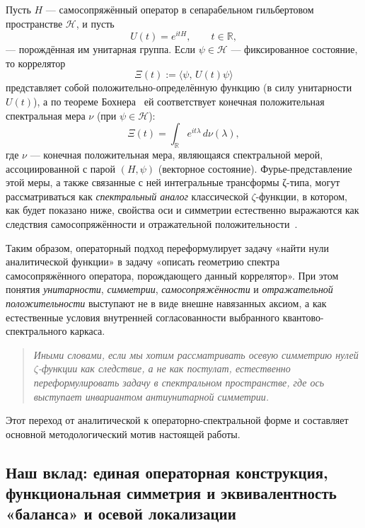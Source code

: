 \documentclass{article}
\numberwithin{equation}{section}
\theoremstyle{plain}
\theoremstyle{definition}
\theoremstyle{remark}
\begin{document}
\medskip
\noindent
Пусть $H$ — самосопряжённый оператор в сепарабельном гильбертовом пространстве $\mathcal H$, и пусть
\begin{equation}
U(t)=e^{itH},\qquad t\in\mathbb R,
\end{equation}
— порождённая им унитарная группа.  
Если $\psi\in\mathcal H$ — фиксированное состояние, то коррелятор
\begin{equation}
\Xi(t):=\langle\psi,\,U(t)\psi\rangle
\end{equation}
представляет собой положительно-определённую функцию (в силу унитарности $U(t)$), 
а по теореме Бохнера~\cite{Bochner1933} ей соответствует конечная положительная спектральная мера $\nu$
(при $\psi\in\mathcal H$):
\begin{equation}
\Xi(t)=\int_{\mathbb R} e^{it\lambda}\,d\nu(\lambda),
\end{equation}
где $\nu$ — конечная положительная мера, являющаяся спектральной мерой, ассоциированной с парой $(H,\psi)$ (векторное состояние). 
Фурье-представление этой меры, а также связанные с ней интегральные трансформы ζ-типа, могут рассматриваться как \emph{спектральный аналог} классической $\zeta$-функции, в котором, как будет показано ниже, свойства оси и симметрии естественно выражаются как следствия самосопряжённости и отражательной положительности~\cite{LaxPhillips1976}.

\medskip
\noindent
Таким образом, операторный подход переформулирует задачу «найти нули аналитической функции» в задачу «описать геометрию спектра самосопряжённого оператора, порождающего данный коррелятор».  
При этом понятия \emph{унитарности}, \emph{симметрии}, \emph{самосопряжённости} и \emph{отражательной положительности} выступают не в виде внешне навязанных аксиом, а как естественные условия внутренней согласованности выбранного квантово-спектрального каркаса.

\begin{quote}
\textit{Иными словами, если мы хотим рассматривать осевую симметрию нулей $\zeta$-функции как следствие, а не как постулат, естественно переформулировать задачу в спектральном пространстве, где ось выступает инвариантом антиунитарной симметрии.}
\end{quote}

\medskip
\noindent
Этот переход от аналитической к операторно-спектральной форме и составляет основной методологический мотив настоящей работы.


\subsection{Наш вклад: единая операторная конструкция, функциональная симметрия и эквивалентность «баланса» и осевой локализации}
\label{subsec:our_contribution}
\end{document}
